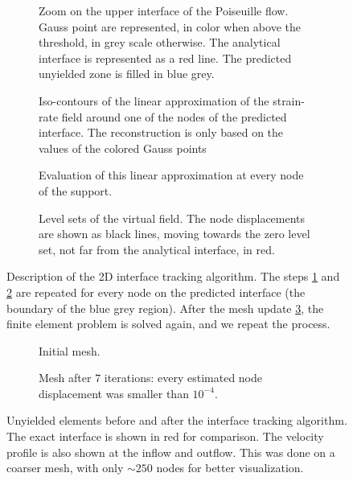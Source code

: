 \documentclass[11 pt]{report}
\begin{document}
\vfill
\begin{figure}[H]
    \centering
    \begin{subfigure}[t]{0.48\textwidth}
        
        \caption{Zoom on the upper interface of the Poiseuille flow. Gauss point are represented, in color when above the threshold, in grey scale otherwise. The analytical interface is represented as a red line. The predicted unyielded zone is filled in blue grey.}
    \end{subfigure}\hfill
    \begin{subfigure}[t]{0.48\textwidth}
        
        \caption{Iso-contours of the linear approximation of the strain-rate field around one of the nodes of the predicted interface. The reconstruction is only based on the values of the colored Gauss points}
        \label{fig:build_approx}
    \end{subfigure}\vspace{20pt}
    \begin{subfigure}[t]{0.48\textwidth}
        
        \caption{Evaluation of this linear approximation at every node of the support.}
        \label{fig:eval_approx}
    \end{subfigure}\hfill
    \begin{subfigure}[t]{0.48\textwidth}
        
        \caption{Level sets of the virtual field. The node displacements are shown as black lines, moving towards the zero level set, not far from the analytical interface, in red.}
        \label{fig:targets}
    \end{subfigure}
    \caption{Description of the 2D interface tracking algorithm. The steps \ref{fig:build_approx} and \ref{fig:eval_approx} are repeated for every node on the predicted interface (the boundary of the blue grey region). After the mesh update \ref{fig:targets}, the finite element problem is solved again, and we repeat the process.}
    \label{fig:rec2d_a}
\end{figure}
\vfill

\begin{figure}[H]
    \centering
    \begin{subfigure}[t]{\textwidth}
        
        \caption{Initial mesh.}
    \end{subfigure}
    \begin{subfigure}[t]{\textwidth}
        
        \caption{Mesh after $7$ iterations: every estimated node displacement was smaller than $10^{-4}$.}
    \end{subfigure}
    \caption{Unyielded elements before and after the interface tracking algorithm. The exact interface is shown in red for comparison. The velocity profile is also shown at the inflow and outflow. This was done on a coarser mesh, with only $\sim 250$ nodes for better visualization.}
\end{figure}
\end{document}

